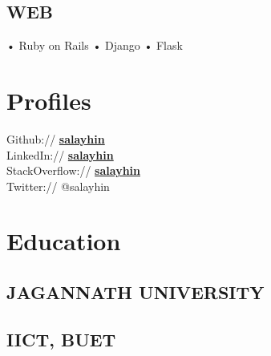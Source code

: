 \documentclass[letterpaper]{deedy-resume} %
\begin{document}
\begin{minipage}[t]{0.33\textwidth}
\subsection{WEB}
• Ruby on Rails • Django • Flask

\sectionspace %


\section{Profiles} 
Github:// \href{https://github.com/salayhin}{\bf salayhin} \\
LinkedIn:// \href{https://www.linkedin.com/in/salayhin}{\bf salayhin} \\
StackOverflow:// \href{https://stackoverflow.com/users/717600/sirajus-salayhin}{\bf salayhin} \\
Twitter:// @salayhin
\sectionspace %

\section{Education} 
\subsection{JAGANNATH UNIVERSITY}

\sectionspace %

\subsection{IICT, BUET}


\end{minipage} %
\hfill
%
%
\end{document}

